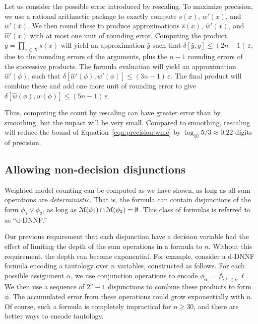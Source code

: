 \documentclass[letterpaper,USenglish,cleveref, autoref, thm-restate]{lipics-v2021}
\newcommand{\obar}[1]{\overline{#1}}
\newcommand{\lit}{\ell}
\newcommand{\approximate}[1]{\hat{#1}}
\newcommand{\approxy}{\approximate{y}}
\newcommand{\approxw}{\approximate{w}}
\newcommand{\approxs}{\approximate{s}}
\newcommand{\aerror}{\delta}
\newcommand{\roundepsilon}{\varepsilon}
\newcommand{\varset}{X}
\newcommand{\assign}{\alpha}
\newcommand{\modelset}{{\cal M}}
\begin{document}
Let us consider the possible error introduced by rescaling.  To maximize precision, we
use a rational arithmetic package to exactly compute $s(x)$, $w'(x)$, and $w'(\obar{x})$.  We then round these to produce
approximations $\approxs(x)$, $\approxw'(x)$, and $\approxw'(\obar{x})$ with at most one unit of rounding error.
Computing the product $y = \prod_{x\in\varset} s(x)$ will yield an approximation $\approxy$ such that
$\aerror[\approxy, y] \leq (2n-1) \,\roundepsilon$, due to the rounding errors of the arguments, plus the $n-1$ rounding errors of the successive products.
The formula evaluation will yield an approximation $\approxw'(\phi)$, such that
$\aerror[\approxw'(\phi), w'(\phi)] \leq (3n-1) \,\roundepsilon$.  The final product will combine these and add one more unit of rounding error to give
$\aerror[\approxw(\phi), w(\phi)] \leq (5n-1) \,\roundepsilon$.

Thus, computing the count by rescaling can have greater error than by smoothing, but the impact will be very small.
Compared to smoothing, rescaling will reduce the bound of Equation~\ref{eqn:precision:wmc} by $\log_{10} 5/3 \approx 0.22$ digits of precision.

\subsection{Allowing non-decision disjunctions}

Weighted model counting can be computed as we have shown, as long as
all sum operations are \emph{deterministic}.  That is, the formula can
contain disjunctions of the form $\phi_1 \lor \phi_2$, as long as
$\modelset(\phi_1) \cap \modelset(\phi_2) = \emptyset$.  This class of formulas is referred to as ``d-DNNF.''

Our previous requirement that each disjunction have a decision variable
had the effect of limiting the depth of the sum operations in a
formula to $n$.  Without this requirement, the depth can become exponential.
For example, consider a d-DNNF formula encoding a tautology over $n$
variables, constructed as follows.  For each possible assignment
$\assign$, we use conjunction operations to encode 
$\phi_{\assign} = \bigwedge_{\lit \in \assign} \lit$.  We then use a sequence of $2^n-1$ disjunctions to combine these products to form $\phi$.
The accumulated error from these operations could grow exponentially with $n$.
Of course, such a formula is completely impractical for $n \geq 30$, and there are better ways to encode tautology.
\end{document}
